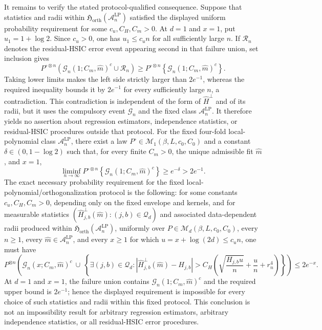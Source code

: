 It remains to verify the stated protocol-qualified consequence. Suppose that statistics and radii within \(\mathfrak H_{\mathrm{orth}}(\mathcal A_n^{\mathrm{LP}})\) satisfied the displayed uniform probability requirement for some \(c_u,C_H,C_m>0\). At \(d=1\) and \(x=1\), put \(u_1=1+\log2\). Since \(c_u>0\), one has \(u_1\le c_u n\) for all sufficiently large \(n\). If \(\mathcal R_n\) denotes the residual-HSIC error event appearing second in that failure union, set inclusion gives
\[
P^{\circ\otimes n}\!\left(
\mathcal G_n(1;C_m,\widehat m)^c\cup\mathcal R_n
\right)
\ge
P^{\circ\otimes n}\!\left\{\mathcal G_n(1;C_m,\widehat m)^c\right\}.
\]
Taking lower limits makes the left side strictly larger than \(2e^{-1}\), whereas the required inequality bounds it by \(2e^{-1}\) for every sufficiently large \(n\), a contradiction. This contradiction is independent of the form of \(\widehat H^\perp\) and of its radii, but it uses the compulsory event \(\mathcal G_n\) and the fixed class \(\mathcal A_n^{\mathrm{LP}}\). It therefore yields no assertion about regression estimators, independence statistics, or residual-HSIC procedures outside that protocol.
For the fixed four-fold local-polynomial class \(\mathcal A_n^{\mathrm{LP}}\), there exist a law \(P^\circ\in\mathcal M_1(\beta,L,c_0,C_0)\) and a constant \(\delta\in(0,1-\log 2)\) such that, for every finite \(C_m>0\), the unique admissible fit \(\widehat m\), and \(x=1\),
\[
\liminf_{n\to\infty}P^{\circ\otimes n}\!\left\{\mathcal G_n(1;C_m,\widehat m)^c\right\}\ge e^{-\delta}>2e^{-1}.
\]
The exact necessary probability requirement for the fixed local-polynomial/orthogonalization protocol is the following: for some constants \(c_u,C_H,C_m>0\), depending only on the fixed envelope and kernels, and for measurable statistics \((\widehat H^\perp_{j,b}(\widehat m):(j,b)\in\mathcal Q_d)\) and associated data-dependent radii produced within \(\mathfrak H_{\mathrm{orth}}(\mathcal A_n^{\mathrm{LP}})\), uniformly over \(P\in\mathcal M_d(\beta,L,c_0,C_0)\), every \(n\ge1\), every \(\widehat m\in\mathcal A_n^{\mathrm{LP}}\), and every \(x\ge1\) for which \(u=x+\log(2d)\le c_u n\), one must have
\[
P^{\otimes n}\!\left(
\mathcal G_n(x;C_m,\widehat m)^c
\ \cup\
\left\{\exists(j,b)\in\mathcal Q_d:
\left|\widehat H^\perp_{j,b}(\widehat m)-H_{j,b}\right|
>C_H\left(\sqrt{\frac{H_{j,b}u}{n}}+\frac{u}{n}+r_n^4\right)
\right\}
\right)\le2e^{-x}.
\]
At \(d=1\) and \(x=1\), the failure union contains \(\mathcal G_n(1;C_m,\widehat m)^c\) and the required upper bound is \(2e^{-1}\); hence the displayed requirement is impossible for every choice of such statistics and radii within this fixed protocol. This conclusion is not an impossibility result for arbitrary regression estimators, arbitrary independence statistics, or all residual-HSIC error procedures.
